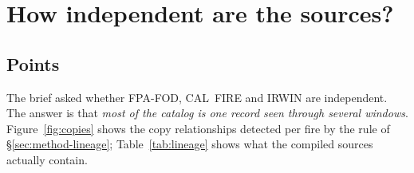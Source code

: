 \documentclass[11pt,a4paper]{article}
\begin{document}
\section{How independent are the sources?}
\label{sec:independence}

\subsection{Points}

The brief asked whether FPA-FOD, CAL~FIRE and IRWIN are independent. The answer is that \emph{most of the
catalog is one record seen through several windows}. Figure~\ref{fig:copies} shows the copy relationships
detected per fire by the rule of \S\ref{sec:method-lineage}; Table~\ref{tab:lineage} shows what the compiled
sources actually contain.
\end{document}
